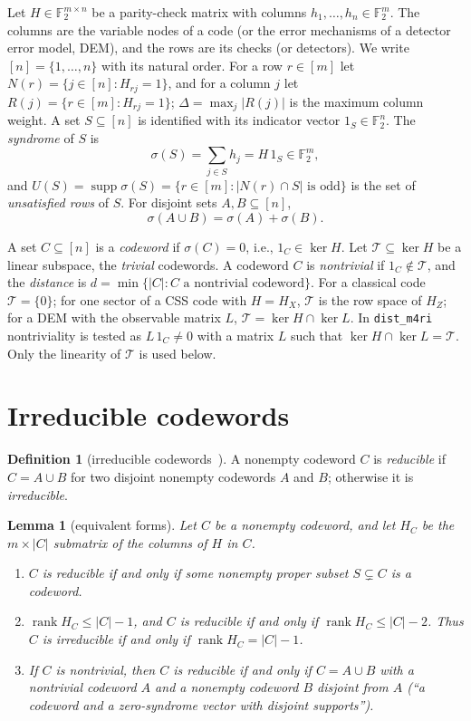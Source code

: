 \documentclass[11pt]{article}
\newtheorem{lemma}[theorem]{Lemma}
\theoremstyle{definition}
\newtheorem{definition}[theorem]{Definition}
\newcommand{\Ftwo}{\mathbb{F}_2}
\DeclareMathOperator{\supp}{supp}
\DeclareMathOperator{\rank}{rank}
\newcommand{\Tr}{\mathcal{T}}   %
\newcommand{\ttt}[1]{\texttt{#1}}
\begin{document}
Let $H\in\Ftwo^{m\times n}$ be a parity-check matrix with columns $h_1,\dots,h_n\in\Ftwo^m$. The columns are the
variable nodes of a code (or the error mechanisms of a detector error model, DEM), and the rows are its checks (or
detectors). We write $[n]=\{1,\dots,n\}$ with its natural order. For a row $r\in[m]$ let
$N(r)=\{j\in[n]:H_{rj}=1\}$, and for a column $j$ let $R(j)=\{r\in[m]:H_{rj}=1\}$; $\Delta=\max_j|R(j)|$ is the
maximum column weight. A set $S\subseteq[n]$ is identified with its indicator vector $1_S\in\Ftwo^n$. The
\emph{syndrome} of $S$ is
\[
  \sigma(S)=\sum_{j\in S}h_j=H\,1_S\in\Ftwo^m ,
\]
and $U(S)=\supp\sigma(S)=\{r\in[m]:|N(r)\cap S|\text{ is odd}\}$ is the set of \emph{unsatisfied rows} of $S$. For
disjoint sets $A,B\subseteq[n]$,
\begin{equation}\label{eq:additive}
  \sigma(A\cup B)=\sigma(A)+\sigma(B).
\end{equation}

A set $C\subseteq[n]$ is a \emph{codeword} if $\sigma(C)=0$, i.e., $1_C\in\ker H$. Let $\Tr\subseteq\ker H$ be a
linear subspace, the \emph{trivial} codewords. A codeword $C$ is \emph{nontrivial} if $1_C\notin\Tr$, and the
\emph{distance} is $d=\min\{|C|: C\text{ a nontrivial codeword}\}$. For a classical code $\Tr=\{0\}$; for one sector
of a CSS code with $H=H_X$, $\Tr$ is the row space of $H_Z$; for a DEM with the observable matrix $L$,
$\Tr=\ker H\cap\ker L$. In \ttt{dist\_m4ri} nontriviality is tested as $L\,1_C\neq0$ with a matrix $L$ such that
$\ker H\cap\ker L=\Tr$. Only the linearity of $\Tr$ is used below.

\section{Irreducible codewords}\label{sec:irreducible}

\begin{definition}[irreducible codewords~\cite{DKP17}]\label{def:irreducible}
A nonempty codeword $C$ is \emph{reducible} if $C=A\cup B$ for two disjoint nonempty codewords $A$ and $B$; otherwise
it is \emph{irreducible}.
\end{definition}

\begin{lemma}[equivalent forms]\label{lem:forms}
Let $C$ be a nonempty codeword, and let $H_C$ be the $m\times|C|$ submatrix of the columns of $H$ in $C$.
\begin{enumerate}[label=(\alph*)]
  \item $C$ is reducible if and only if some nonempty proper subset $S\subsetneq C$ is a codeword.
  \item $\rank H_C\le|C|-1$, and $C$ is reducible if and only if $\rank H_C\le|C|-2$. Thus $C$ is irreducible if and
    only if $\rank H_C=|C|-1$.
  \item If $C$ is nontrivial, then $C$ is reducible if and only if $C=A\cup B$ with a nontrivial codeword $A$ and a
    nonempty codeword $B$ disjoint from $A$ (``a codeword and a zero-syndrome vector with disjoint supports'').
\end{enumerate}
\end{lemma}
\end{document}
